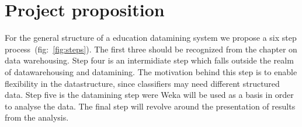 \chapter{Project proposition}
	For the general structure of a education datamining system we propose 
	a six step process~(fig:~\ref{fig:steps}). 
	The first three should be recognized from the chapter on data warehousing. 
	Step four is an intermidiate step which falls outside the realm of datawarehousing and datamining. 
	The motivation behind this step is to enable flexibility in the datastructure, since classifiers may need different structured data.
	Step five is the datamining step were Weka will be used as a basis
	in order to analyse the data. 
	The final step will revolve around the presentation of results from the analysis. 
	

%

